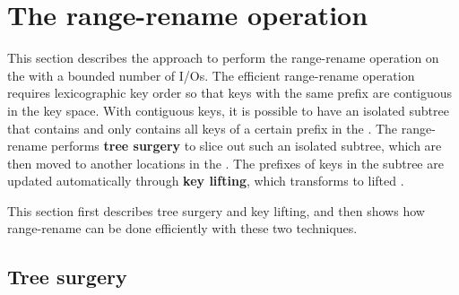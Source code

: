 \section{The range-rename operation}

This section describes the approach to perform the range-rename operation on the
\bet with a bounded number of I/Os.
The efficient range-rename operation requires lexicographic key order so that
keys with the same prefix are contiguous in the key space.
With contiguous keys, it is possible to have an isolated subtree that contains
and only contains all keys of a certain prefix in the \bet.
The range-rename performs \textbf{tree surgery} to slice out such an isolated
subtree, which are then moved to another locations in the \bet.
The prefixes of keys in the subtree are updated automatically through
\textbf{key lifting}, which transforms \bets to lifted \bets.

This section first describes tree surgery and key lifting, and then shows how
range-rename can be done efficiently with these two techniques.

\subsection{Tree surgery}


